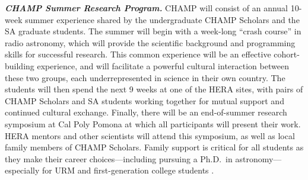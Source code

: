 \documentclass[preprint,11pt]{aastex}
\begin{document}

\emph{\textbf{CHAMP Summer Research Program.}} CHAMP will consist of an annual 10-week summer experience shared by the undergraduate CHAMP Scholars and the SA graduate students. The summer will begin with a week-long ``crash course'' in radio astronomy, which will provide the scientific background and programming skills for successful research. This common experience will be an effective cohort-building experience, and will facilitate a powerful cultural interaction between these two groups, each underrepresented in science in their own country.  The students will then spend the next 9 weeks at one of the HERA sites, with pairs of CHAMP Scholars and SA students working together for mutual support and continued cultural exchange. Finally, there will be an end-of-summer research symposium at Cal Poly Pomona at which all participants will present their work. HERA mentors and other scientists will attend this symposium, as well as local family members of CHAMP Scholars.
Family support is critical for all students as they make their career choices---including pursuing a Ph.D.\ in astronomy---especially for URM and first-generation college students \citep{slovacek_et_al2011}. 
\end{document}
